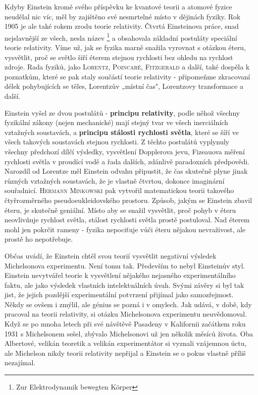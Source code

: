         Kdyby Einstein kromě svého příspěvku ke kvantové teorii a atomové fyzice neudělal nic víc,
        měl by zajištěno své nesmrtelné místo v dějinách fyziky. Rok 1905 je ale také rokem zrodu
        teorie relativity. Čtvrtá Einsteinova práce, snad nejslavnější ze všech, nesla název
        \emph{}\footnote{Zur Elektrodynamik bewegten
        Körper} a obsahovala základní postuláty speciální teorie relativity. Víme už, jak se fyzika
        marně snažila vyrovnat s otázkou éteru, vysvětlit, proč se světlo šiří éterem stejnou
        rychlosti bez ohledu na rychlost zdroje. Rada fyziků, jako \textsc{Lorentz},
        \textsc{Poincaré}, \textsc{Fitzgerald} a další, také dospěla k poznatkům, které se pak staly
        součástí teorie relativity - připomeňme zkracovaní délek pohybujících se těles, Lorentzův
        „místní čas", Lorentzovy transformace a další.
        
        Einstein vyšel ze dvou postulátů - \textbf{principu relativity}, podle něhož všechny
        fyzikální zákony (nejen mechanické) mají stejný tvar ve všech inerciálních vztažných
        soustavách, a \textbf{principu stálosti rychlosti světla}, které se šíří ve všech takových
        soustavách stejnou rychlosti. Z těchto postulátů vyplynuly všechny předchozí dílčí výsledky,
        vysvětlení Dopplerova jevu, Fizeauova měření rychlosti světla v proudící vodě a řada
        dalších, zdánlivě paradoxních předpovědi. Narozdíl od Lorentze měl Einstein odvahu
        připustit, že čas skutečně plyne jinak různých vztažných soustavách, že je vlastně čtvrtou,
        dokonce imaginární souřadnicí. \textsc{Hermann Minkowski} pak vytvořil matematickou teorii
        takového čtyřrozměrného pseudoeukleidovského prostoru. Způsob, jakým se Einstein zbavil
        éteru, je skutečně geniální. Místo aby se snažil vysvětlit, proč pohyb v éteru neovlivňuje
        rychlost světla, stálost rychlosti světla prostě postuloval. Nad éterem mohl jen pokrčit
        rameny - fyzika nepociťuje vůči éteru nějakou nevraživost, ale prostě ho nepotřebuje.

        Občas uvádí, že Einstein chtěl svou teorií vysvětlit negativní výsledek Michelsonova
        experimentu. Není tomu tak. Především to nebyl Einsteinův styl. Einstein nevytvářel teorie k
        vysvětlení nějakého nejasného experimentálního faktu, ale jako výsledek vlastních
        intelektuálních úvah. Svými závěry si byl tak jist, že jejich pozdější experimentální
        potvrzení přijímal jako samozřejmost. Někdy se ovšem i zmýlil, ale génius se pozná i v
        omylech. Jak udává, v době, kdy pracoval na teorii relativity, si otázku Michelsonova
        experimentu neuvědomoval. Když se po mnoha letech při své návštěvě Pasadeny v Kalifornii
        začátkem roku 1931 s Michelsonem sešel, zbývalo Michelsonovi už jen několik měsíců života.
        Oba Albertové, velikán teoretik a velikán experimentátor si vyznali vzájemnou úctu, ale
        Michelson nikdy teorii relativity nepřijal a Einstein se o pokus vlastně příliš nezajímal.

